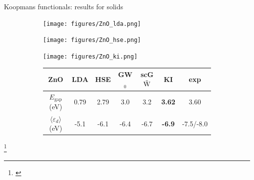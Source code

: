 \documentclass[xcolor=table,aspectratio=169]{beamer}
\newcommand\blfootcite[1]{%
  \begingroup
  \renewcommand\thefootnote{}\footnote{\hspace{-4ex}\cite{#1}}%
  \addtocounter{footnote}{-1}%
  \endgroup
}
\numberwithin{equation}{section}
\begin{document}
\begin{frame}{Koopmans functionals: results for solids}
   \begin{figure}[t]
      \centering
      \begin{subfigure}{0.3\textwidth}
         \texttt{[image: figures/ZnO\_lda.png]}
      \end{subfigure}
      \begin{subfigure}{0.3\textwidth}
         \texttt{[image: figures/ZnO\_hse.png]}
      \end{subfigure}
      \begin{subfigure}{0.3\textwidth}
         \texttt{[image: figures/ZnO\_ki.png]}
      \end{subfigure}
      \begin{subfigure}{\textwidth} %
         \centering
         \begin{tabular}{c S[table-format = 2.2] S[table-format = 2.2] S[table-format = 2.2] S[table-format = 2.2] >{\color{seaborn_red}\bfseries}S[table-format = 2.2] S[table-format = 2.2]}
            ZnO                                  & {LDA} & {HSE} & {GW$_0$} & {scG$\tilde{\rm W}$} & {KI} & {exp}       \\
            \hline
            $E_\mathrm{gap}$ (eV)                & 0.79  & 2.79  & 3.0      & 3.2                  & 3.62 & 3.60        \\
            $\langle \varepsilon_d \rangle$ (eV) & -5.1  & -6.1  & -6.4     & -6.7                 & -6.9 & {-7.5/-8.0} \\
         \end{tabular}
      \end{subfigure}
   \end{figure}
   \blfootcite{Colonna2022}
\end{frame}
\end{document}
